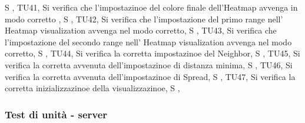 {{        S
       },
       {
       TU41,
        Si verifica che l'impostazinoe del colore finale dell'Heatmap avvenga in modo corretto ,
        S
       },
       {
       TU42,
        Si verifica che l'impostazione del primo range nell' Heatmap visualization avvenga nel modo corretto,
        S
       },
       {
       TU43,
       Si verifica che l'impostazione del secondo range nell' Heatmap visualization avvenga nel modo corretto,
        S
       },
       {
       TU44,
       Si verifica la corretta impostazinoe del Neighbor,
        S
       },
       {
       TU45,
       Si verifica la corretta avvenuta dell'impostazinoe di distanza minima,
        S
       },
       {
       TU46,
       Si verifica la corretta avvenuta dell'impostazinoe di Spread,
        S
       },
       {
       TU47,
       Si verifica la corretta inizializzazinoe della visualizzazinoe,
        S
       },
    }
    

    \subsubsection{Test di unità - server}
    \hphantom{}

